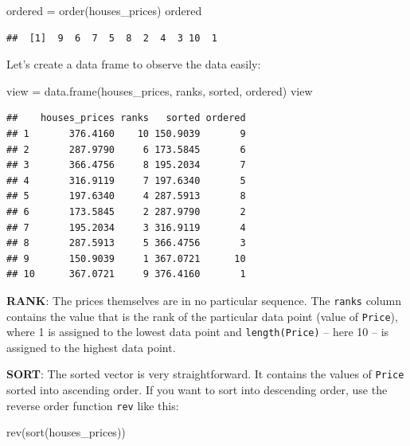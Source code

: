 \documentclass[
]{book}
\newenvironment{Shaded}{\begin{snugshade}}{\end{snugshade}}
\newcommand{\FunctionTok}[1]{\textcolor[rgb]{0.00,0.00,0.00}{#1}}
\newcommand{\NormalTok}[1]{#1}
\newcommand{\OtherTok}[1]{\textcolor[rgb]{0.56,0.35,0.01}{#1}}
\begin{document}
\begin{Shaded}
\begin{Highlighting}[]
\NormalTok{ordered }\OtherTok{=} \FunctionTok{order}\NormalTok{(houses\_prices)}
\NormalTok{ordered}
\end{Highlighting}
\end{Shaded}

\begin{verbatim}
##  [1]  9  6  7  5  8  2  4  3 10  1
\end{verbatim}

Let's create a data frame to observe the data easily:

\begin{Shaded}
\begin{Highlighting}[]
\NormalTok{view }\OtherTok{=} \FunctionTok{data.frame}\NormalTok{(houses\_prices, ranks, sorted, ordered)}
\NormalTok{view}
\end{Highlighting}
\end{Shaded}

\begin{verbatim}
##    houses_prices ranks   sorted ordered
## 1       376.4160    10 150.9039       9
## 2       287.9790     6 173.5845       6
## 3       366.4756     8 195.2034       7
## 4       316.9119     7 197.6340       5
## 5       197.6340     4 287.5913       8
## 6       173.5845     2 287.9790       2
## 7       195.2034     3 316.9119       4
## 8       287.5913     5 366.4756       3
## 9       150.9039     1 367.0721      10
## 10      367.0721     9 376.4160       1
\end{verbatim}

\textbf{RANK}: The prices themselves are in no particular sequence. The \texttt{ranks} column contains the value that is the rank of the particular data point (value of \texttt{Price}), where 1 is assigned to the lowest data point and \texttt{length(Price)} -- here 10 -- is assigned to the highest data point.

\textbf{SORT}: The sorted vector is very straightforward. It contains the values of \texttt{Price} sorted into ascending order. If you want to sort into descending order, use the reverse order function \texttt{rev} like this:

\begin{Shaded}
\begin{Highlighting}[]
\FunctionTok{rev}\NormalTok{(}\FunctionTok{sort}\NormalTok{(houses\_prices))}
\end{Highlighting}
\end{Shaded}
\end{document}

